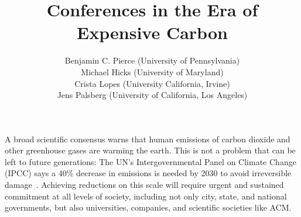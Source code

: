 \documentclass[12pt]{article}
\begin{document}
\title{\Huge Conferences in the Era of Expensive Carbon}
\author{Benjamin C. Pierce (University of Pennsylvania) \\
Michael Hicks (University of Maryland) \\
Crista Lopes (University California, Irvine) \\
Jens Palsberg (University of California, Los Angeles)}

\maketitle




A broad scientific consensus warns that human
emissions of carbon dioxide and other greenhouse gases are warming the earth.
This is not a problem that can be left to future
generations: The UN's Intergovernmental
Panel on Climate Change (IPCC) says a 40\% decrease in
emissions is needed by 2030 to avoid irreversible damage~\cite{IPCC-report}.
Achieving reductions on this scale will
require urgent and sustained commitment at all levels of society, including
not only city, state, and national governments, but also 
universities, companies, and scientific societies
like ACM. 


\end{document}
